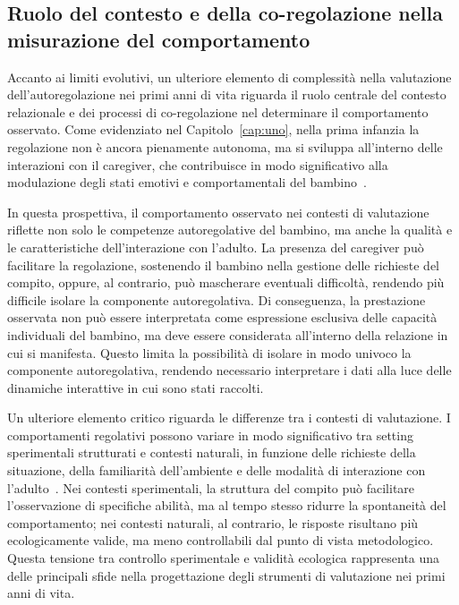         \subsection{Ruolo del contesto e della co-regolazione nella misurazione del comportamento}
        \label{sec:3_2_2}

            Accanto ai limiti evolutivi, un ulteriore elemento di complessità nella valutazione dell'autoregolazione nei primi anni di vita riguarda il ruolo centrale del contesto relazionale e dei processi di co-regolazione nel determinare il comportamento osservato. Come evidenziato nel Capitolo~\ref{cap:uno}, nella prima infanzia la regolazione non è ancora pienamente autonoma, ma si sviluppa all'interno delle interazioni con il caregiver, che contribuisce in modo significativo alla modulazione degli stati emotivi e comportamentali del bambino~\cite{calkins2007}.

            In questa prospettiva, il comportamento osservato nei contesti di valutazione riflette non solo le competenze autoregolative del bambino, ma anche la qualità e le caratteristiche dell'interazione con l'adulto. La presenza del caregiver può facilitare la regolazione, sostenendo il bambino nella gestione delle richieste del compito, oppure, al contrario, può mascherare eventuali difficoltà, rendendo più difficile isolare la componente autoregolativa. Di conseguenza, la prestazione osservata non può essere interpretata come espressione esclusiva delle capacità individuali del bambino, ma deve essere considerata all'interno della relazione in cui si manifesta. Questo limita la possibilità di isolare in modo univoco la componente autoregolativa, rendendo necessario interpretare i dati alla luce delle dinamiche interattive in cui sono stati raccolti.

            Un ulteriore elemento critico riguarda le differenze tra i contesti di valutazione. I comportamenti regolativi possono variare in modo significativo tra setting sperimentali strutturati e contesti naturali, in funzione delle richieste della situazione, della familiarità dell'ambiente e delle modalità di interazione con l'adulto~\cite{doebel2020,mcclelland2012}. Nei contesti sperimentali, la struttura del compito può facilitare l'osservazione di specifiche abilità, ma al tempo stesso ridurre la spontaneità del comportamento; nei contesti naturali, al contrario, le risposte risultano più ecologicamente valide, ma meno controllabili dal punto di vista metodologico. Questa tensione tra controllo sperimentale e validità ecologica rappresenta una delle principali sfide nella progettazione degli strumenti di valutazione nei primi anni di vita.

